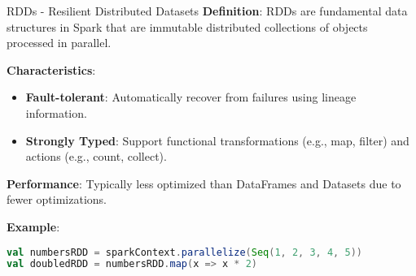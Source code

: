 \documentclass[aspectratio=169]{beamer}
\begin{document}
\begin{frame}[fragile]{RDDs - Resilient Distributed Datasets}
    \textbf{Definition}: RDDs are fundamental data structures in Spark that are immutable distributed collections of objects processed in parallel.

    \textbf{Characteristics}:
    \begin{itemize}
        \item \textbf{Fault-tolerant}: Automatically recover from failures using lineage information.
        \item \textbf{Strongly Typed}: Support functional transformations (e.g., map, filter) and actions (e.g., count, collect).
    \end{itemize}

    \textbf{Performance}: Typically less optimized than DataFrames and Datasets due to fewer optimizations.

    \textbf{Example}:
    \begin{lstlisting}[language=scala]
val numbersRDD = sparkContext.parallelize(Seq(1, 2, 3, 4, 5))
val doubledRDD = numbersRDD.map(x => x * 2)
    \end{lstlisting}
\end{frame}
\end{document}
